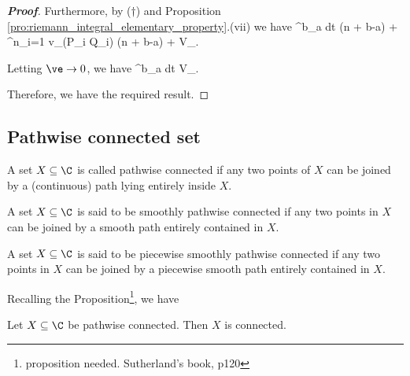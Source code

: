 \begin{proof}[\bf Proof]
Furthermore, by ($\dag$) and Proposition \ref{pro:riemann_integral_elementary_property}.(vii) we have
\be
\int^b_a dt \leq \ve(n + b-a) + \sum^n_{i=1} v_\gamma(P_i \cup Q_i) \leq \ve(n + b-a) + V_\gamma[a,b].
\ee

Letting $\ve\to 0$, we have 
\be
\int^b_a dt \leq V_\gamma[a,b].
\ee

Therefore, we have the required result.
\end{proof}





\subsection{Pathwise connected set}

\begin{definition}\label{def:pathwise_connected_set_complex_space}
A set $X\subseteq \C$ is called pathwise connected if any two points of $X$ can be joined by a (continuous) path lying entirely inside $X$.
\end{definition}

\begin{definition}
A set $X\subseteq \C$ is said to be smoothly pathwise connected if any two points in $X$ can be joined by a smooth path entirely contained in $X$.
\end{definition}

\begin{definition}
A set $X\subseteq \C$ is said to be piecewise smoothly pathwise connected if any two points in $X$ can be joined by a piecewise smooth path entirely contained in $X$.
\end{definition}



Recalling the Proposition\footnote{proposition needed. Sutherland's book, p120}, we have

\begin{proposition}\label{pro:pathwise_connected_implies_connected_complex}
Let $X\subseteq \C$ be pathwise connected. Then $X$ is connected.
\end{proposition}


%

